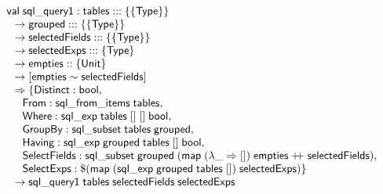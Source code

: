 \documentclass{article}
\newcommand{\mt}[1]{\mathsf{#1}}
\newcommand{\rc}{+ \hspace{-.075in} + \;}
\begin{document}
$$\begin{array}{l}
  \mt{val} \; \mt{sql\_query1} : \mt{tables} ::: \{\{\mt{Type}\}\} \\
  \hspace{.1in} \to \mt{grouped} ::: \{\{\mt{Type}\}\} \\
  \hspace{.1in} \to \mt{selectedFields} ::: \{\{\mt{Type}\}\} \\
  \hspace{.1in} \to \mt{selectedExps} ::: \{\mt{Type}\} \\
  \hspace{.1in} \to \mt{empties} :: \{\mt{Unit}\} \\
  \hspace{.1in} \to [\mt{empties} \sim \mt{selectedFields}] \\
  \hspace{.1in} \Rightarrow \{\mt{Distinct} : \mt{bool}, \\
  \hspace{.2in} \mt{From} : \mt{sql\_from\_items} \; \mt{tables}, \\
  \hspace{.2in} \mt{Where} : \mt{sql\_exp} \; \mt{tables} \; [] \; [] \; \mt{bool}, \\
  \hspace{.2in} \mt{GroupBy} : \mt{sql\_subset} \; \mt{tables} \; \mt{grouped}, \\
  \hspace{.2in} \mt{Having} : \mt{sql\_exp} \; \mt{grouped} \; \mt{tables} \; [] \; \mt{bool}, \\
  \hspace{.2in} \mt{SelectFields} : \mt{sql\_subset} \; \mt{grouped} \; (\mt{map} \; (\lambda \_ \Rightarrow []) \; \mt{empties} \rc \mt{selectedFields}), \\
  \hspace{.2in} \mt {SelectExps} : \$(\mt{map} \; (\mt{sql\_exp} \; \mt{grouped} \; \mt{tables} \; []) \; \mt{selectedExps}) \} \\
  \hspace{.1in} \to \mt{sql\_query1} \; \mt{tables} \; \mt{selectedFields} \; \mt{selectedExps}
\end{array}$$
\end{document}
